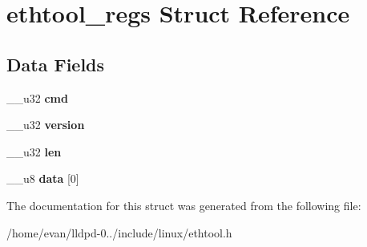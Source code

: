 \section{ethtool\-\_\-regs \-Struct \-Reference}
\label{structethtool__regs}
\subsection*{\-Data \-Fields}
\begin{DoxyCompactItemize}
\item 
\-\_\-\-\_\-u32 {\bfseries cmd}\label{structethtool__regs_a66d231264d5aa36fd7d347e2c967769a}

\item 
\-\_\-\-\_\-u32 {\bfseries version}\label{structethtool__regs_a1c857bd0b02d104bdd57a95e6bbcd9f9}

\item 
\-\_\-\-\_\-u32 {\bfseries len}\label{structethtool__regs_a6727c6c5c16cc9c9786bfbfd3f30f9a1}

\item 
\-\_\-\-\_\-u8 {\bfseries data} [0]\label{structethtool__regs_a1bfe8b027f6e5624818c1a92b91bf6d2}

\end{DoxyCompactItemize}


\-The documentation for this struct was generated from the following file\-:\begin{DoxyCompactItemize}
\item 
/home/evan/lldpd-\/0../include/linux/ethtool.\-h\end{DoxyCompactItemize}
